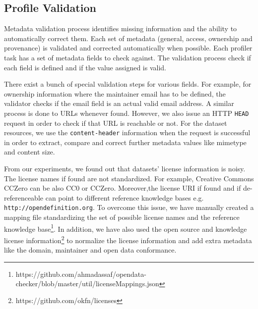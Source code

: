 \documentclass{sig-alternate}
\begin{document}
\subsection{Profile Validation}

Metadata validation process identifies missing information and the ability to automatically correct them. Each set of metadata (general, access, ownership and provenance) is validated and corrected automatically when possible. Each profiler task has a set of metadata fields to check against. The validation process check if each field is defined and if the value assigned is valid.

There exist a bunch of special validation steps for various fields. For example, for ownership information where the maintainer email has to be defined, the validator checks if the email field is an actual valid email address. A similar process is done to URLs whenever found. However, we also issue an HTTP \texttt{HEAD} request in order to check if that URL is reachable or not. For the dataset resources, we use the \texttt{content-header} information when the request is successful in order to extract, compare and correct further metadata values like mimetype and content size.

From our experiments, we found out that datasets' license information is noisy. The license names if found are not standardized. For example, Creative Commons CCZero can be also CC0 or CCZero. Moreover,the license URI if found and if de-referenceable can point to different reference knowledge bases e.g. \texttt{http://opendefinition.org}. To overcome this issue, we have manually created a mapping file standardizing the set of possible license names and the reference knowledge base\footnote{https://github.com/ahmadassaf/opendata-checker/blob/master/util/licenseMappings.json}. In addition, we have also used the open source and knowledge license information\footnote{https://github.com/okfn/licenses} to normalize the license information and add extra metadata like the domain, maintainer and open data conformance.
\end{document}
